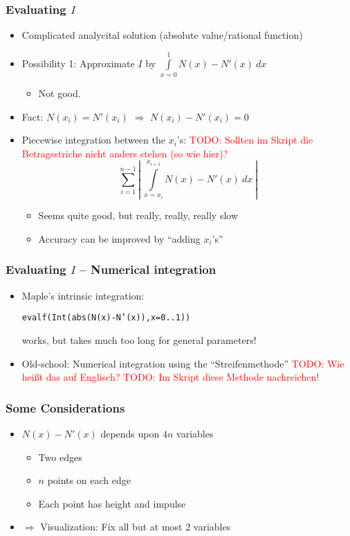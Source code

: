 \documentclass{beamer}
\newcommand{\todo}[1]{\textcolor{red}{TODO: #1}}
\begin{document}
\begin{frame}
  \frametitle{Evaluating $I$}
  \begin{itemize}
  \item Complicated analycital solution (absolute value/rational function)
  \item Possibility 1: Approximate $I$ by $\int\limits_{x=0}^1 N(x) - N'(x) \  dx$
    \begin{itemize}
    \item Not good.
    \end{itemize}
  \item Fact: $N(x_i) = N'(x_i)$ 
    $\Rightarrow$ $N(x_i) - N'(x_i) = 0$
  \item Piecewise integration between the $x_i$'s: \todo{Sollten im Skript die Betragsstriche nicht anders stehen (so wie hier)?}
    \begin{equation*}
      \sum\limits_{i=1}^{n-1} \left|\ \int\limits_{x=x_i}^{x_{i+1}} N(x) - N'(x) \  dx\ \right|
    \end{equation*}
    \begin{itemize}
    \item Seems quite good, but really, really, really slow
    \item Accuracy can be improved by ``adding $x_i$'s''
    \end{itemize}
  \end{itemize}
\end{frame}

\begin{frame}
  \frametitle{Evaluating $I$ -- Numerical integration}
  \begin{itemize}
  \item Maple's intrinsic integration:  
    \begin{center}
      \texttt{evalf(Int(abs(N(x)-N'(x)),x=0..1))}
    \end{center}
    works, but takes much too long for general parameters!
  \item Old-school: Numerical integration using the ``Streifenmethode'' \todo{Wie heißt das auf Englisch?} \todo{Im Skript diese Methode nachreichen!}
  \end{itemize}
\end{frame}

\begin{frame}
  \frametitle{Some Considerations}
  \begin{itemize}
  \item $N(x)-N'(x)$ depends upon $4n$ variables
    \begin{itemize}
    \item Two edges
    \item $n$ points on each edge
    \item Each point has height and impulse
    \end{itemize}
  \item $\Rightarrow$ Visualization: Fix all but at most 2 variables
  \end{itemize}
\end{frame}
\end{document}
